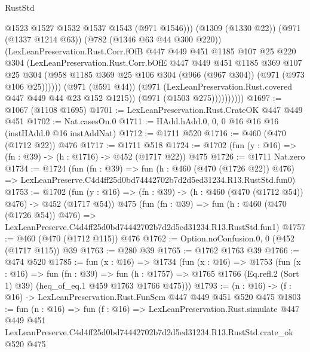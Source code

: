 \begin{lexlean}{RustStd}
\begin{coremodule}
                          @1523
                          @1527
                          @1532
                          @1537
                          @1543
                          (@971 @1546)))
                      (@1309 (@1330 @22))
                      (@971 (@1337 @1214 @63))
                      (@782 (@1346 @63 @44 @300 @220))
                      (LexLeanPreservation.Rust.Corr.fOfB
                        @447
                        @449
                        @451
                        @1185
                        @107
                        @25
                        @220
                        @304
                        (LexLeanPreservation.Rust.Corr.bOfE
                          @447
                          @449
                          @451
                          @1185
                          @369
                          @107
                          @25
                          @304
                          (@958
                            @1185
                            @369
                            @25
                            @106
                            @304
                            (@966 (@967 @304))
                            (@971 (@973 @106 @25))))))
                    (@971 (@591 @44))
                    (@971 (LexLeanPreservation.Rust.covered @447 @449 @44 @23 @152 @1215))
                    (@971 (@1503 @275))))))))))
@1697 := @1067 (@1108 @1695)
@1701 := LexLeanPreservation.Rust.CrateOK @447 @449 @451
@1702 := Nat.casesOn.{0}
@1711 := HAdd.hAdd.{0, 0, 0} @16 @16 @16 (instHAdd.{0} @16 instAddNat)
@1712 := @1711 @520
@1716 := @460 (@470 (@1712 @22)) @476
@1717 := @1711 @518
@1724 := @1702 (fun (y : @16) => (fn : @39) -> (h : @1716) -> @452 (@1717 @22)) @475
@1726 := @1711 Nat.zero
@1734 := @1724
    (fun (fn : @39) =>
    fun (h : @460 (@470 (@1726 @22)) @476) =>
    LexLeanPreserve.C4d4ff25d0bd74442702b7d2d5ed31234.R13.RustStd.fun0)
@1753 := @1702
    (fun (y : @16) => (fn : @39) -> (h : @460 (@470 (@1712 @54)) @476) -> @452 (@1717 @54))
    @475
    (fun (fn : @39) =>
    fun (h : @460 (@470 (@1726 @54)) @476) =>
    LexLeanPreserve.C4d4ff25d0bd74442702b7d2d5ed31234.R13.RustStd.fun1)
@1757 := @460 (@470 (@1712 @115)) @476
@1762 := Option.noConfusion.{0, 0} (@452 (@1717 @115)) @39
@1763 := @280 @39
@1765 := @1762 @1763 @39
@1766 := @474 @520
@1785 := fun (x : @16) =>
  @1734
    (fun (x : @16) =>
    @1753
      (fun (x : @16) =>
      fun (fn : @39) =>
      fun (h : @1757) =>
      @1765 @1766 (Eq.refl.{2} (Sort 1) @39) (heq_of_eq.{1} @459 @1763 @1766 @475)))
@1793 := (n : @16) -> (f : @16) -> LexLeanPreservation.Rust.FunSem @447 @449 @451 @520 @475
@1803 := fun (n : @16) =>
  fun (f : @16) =>
  LexLeanPreservation.Rust.simulate
    @447
    @449
    @451
    LexLeanPreserve.C4d4ff25d0bd74442702b7d2d5ed31234.R13.RustStd.crate_ok
    @520
    @475
\end{coremodule}
\end{lexlean}
